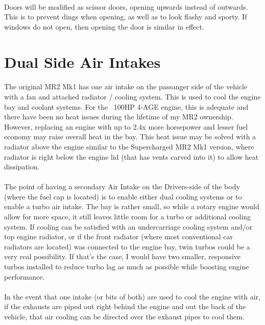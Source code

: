 \documentclass[a4paper,10pt]{report}
\begin{document}
\paragraph*{}Doors will be modified as scissor doors, opening upwards instead of outwards. This is to prevent dings when opening, as well as to look flashy and sporty. If windows do not open, then opening the door is similar in effect.


\section{Dual Side Air Intakes}
\paragraph*{}The original MR2 Mk1 has one air intake on the passanger side of the vehicle with a fan and attached radiator / cooling system. This is used to cool the engine bay and coolant systems. For the ~100HP 4-AGE engine, this is adequate and there have been no heat issues during the lifetime of my MR2 ownership. However, replacing an engine with up to 2.4x more horsepower and lesser fuel economy may raise overall heat in the bay. This heat issue may be solved with a radiator above the engine similar to the Supercharged MR2 Mk1 version, where radiator is right below the engine lid (that has vents carved into it) to allow heat dissipation. 
\paragraph*{}The point of having a secondary Air Intake on the Drivers-side of the body (where the fuel cap is located) is to enable either dual cooling systems or to enable a turbo air intake. The bay is rather small, so while a rotary engine would allow for more space, it still leaves little room for a turbo or additional cooling system. If cooling can be satisfied with an undercarriage cooling system and/or top engine radiator, or if the front radiator (where most conventional car radiators are located) was connected to the engine bay, twin turbos could be a very real possibility. If that's the case, I would have two smaller, responsive turbos installed to reduce turbo lag as much as possible while boosting engine performance.
\paragraph*{}In the event that one intake (or bits of both) are used to cool the engine with air, if the exhausts are piped out right behind the engine and out the back of the vehicle, that air cooling can be directed over the exhaust pipes to cool them.
\end{document}
